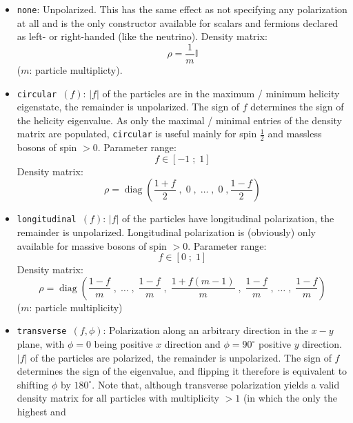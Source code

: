 \documentclass[12pt]{book}
\DeclareMathOperator{\diag}{diag}
\newcommand{\ttt}[1]{\texttt{#1}}
\begin{document}
{

\newcommand{\cssparse}[4]{%
\begin{pmatrix}
  #1     & 0      & \cdots & \cdots & #3     \\
  0      & 0      & \ddots &        & 0      \\
  \vdots & \ddots & \ddots & \ddots & \vdots \\
  0      &        & \ddots & 0      & 0      \\
  #4     & \cdots & \cdots & 0      & #2
\end{pmatrix}%
}
%
\begin{itemize}
\item\ttt{none}:
Unpolarized. This has the same effect as not specifying any
polarization at all and is the only constructor available for scalars and
fermions declared as left- or right-handed (like the neutrino). Density matrix:
\[ \rho = \frac{1}{m}\mathbb{I} \]
($m$: particle multiplicty).
%
\item\ttt{circular $\left(f\right)$}:
$\left|f\right|$ of the
particles are in the maximum / minimum helicity eigenstate, the remainder
is unpolarized. The sign of $f$ determines the sign of the helicity
eigenvalue. As only the maximal / minimal entries of the density matrix are
populated, \ttt{circular} is useful mainly for spin $\frac{1}{2}$ and massless
bosons of spin $>0$. Parameter range:
\[ f \in \left[-1\;;\;1\right] \]
Density matrix:
\[ \rho = \diag\left(\frac{1+f}{2}\;,\;0\;,\;\dots\;,\;0\;,
\frac{1-f}{2}\right) \]
%
\item\ttt{longitudinal $\left(f\right)$}:
$\left|f\right|$ of the
particles have longitudinal polarization, the remainder is unpolarized.
Longitudinal polarization is (obviously) only available for massive bosons of
spin $>0$. Parameter range:
\[ f \in \left[0\;;\;1\right] \]
Density matrix:
\[ \rho = \diag\left(\frac{1-f}{m}\;,\;\dots\;,\;\frac{1-f}{m}\;,\;
\frac{1+f \left(m - 1\right)}{m}\;,\;\frac{1-f}{m}\;,
\;\dots\;,\;\frac{1-f}{m}\right)
\]
($m$: particle multiplicity)
%
\item\ttt{transverse $\left(f, \phi\right)$}:
Polarization along an arbitrary direction
in the $x-y$ plane, with $\phi=0$ being positive $x$ direction and
$\phi=90^\circ$ positive $y$ direction. $\left|f\right|$ of the particles are
polarized, the remainder is unpolarized. The sign of $f$ determines the sign of
the eigenvalue, and flipping it therefore is equivalent to shifting $\phi$ by
$180^\circ$. Note that, although transverse polarization
yields a valid density matrix
for all particles with multiplicity $>1$ (in which the only the highest and

\end{itemize}}
\end{document}
